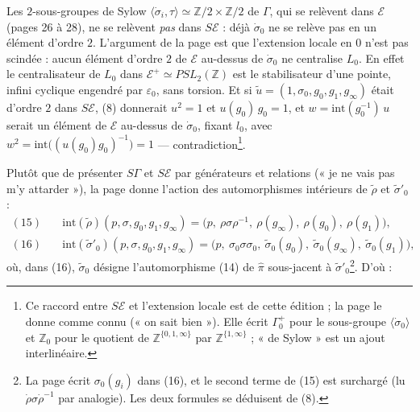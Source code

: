 \documentclass[11pt,a4paper]{article}
\begin{document}
Les $2$-sous-groupes de Sylow $\langle \dot\sigma_i, \tau \rangle \simeq
\mathbb{Z}/2 \times \mathbb{Z}/2$ de $\Gamma$, qui se relèvent dans
$\mathcal{E}$ (pages 26 à 28), ne se relèvent \emph{pas} dans $S\mathcal{E}$ :
déjà $\dot\sigma_0$ ne se relève pas en un élément d'ordre $2$. L'argument de la
page est que l'extension locale en $0$ n'est pas scindée : aucun élément
d'ordre $2$ de $\mathcal{E}$ au-dessus de $\dot\sigma_0$ ne centralise $L_0$. En
effet le centralisateur de $L_0$ dans $\mathcal{E}^{+} \simeq
PSL_2(\mathbb{Z})$ est le stabilisateur d'une pointe, infini cyclique engendré
par $\varepsilon_0$, sans torsion. Et si $\tilde u = (1, \sigma_0, g_0, g_1,
g_\infty)$ était d'ordre $2$ dans $S\mathcal{E}$, (8) donnerait $u^2 = 1$ et
$u(g_0)\,g_0 = 1$, et $w = \mathrm{int}(g_0^{-1})\,u$ serait un élément de
$\mathcal{E}$ au-dessus de $\dot\sigma_0$, fixant $l_0$, avec $w^2 =
\mathrm{int}\bigl((u(g_0)g_0)^{-1}\bigr) = 1$ — contradiction\footnote{Ce
raccord entre $S\mathcal{E}$ et l'extension locale est de cette édition ; la
page le donne comme connu (« on sait bien »). Elle écrit $\Gamma^{+}_0$ pour le
sous-groupe $\langle\dot\sigma_0\rangle$ et $\mathbb{Z}_0$ pour le quotient de
$\mathbb{Z}^{\{0,1,\infty\}}$ par $\mathbb{Z}^{\{1,\infty\}}$ ; « de Sylow » est
un ajout interlinéaire.}.

Plutôt que de présenter $S\Gamma$ et $S\mathcal{E}$ par générateurs et
relations (« je ne vais pas m'y attarder »), la page donne l'action des
automorphismes intérieurs de $\tilde\rho$ et $\tilde\sigma'_0$ :
\[
\begin{aligned}
(15)\quad & \mathrm{int}(\tilde\rho)(p, \sigma, g_0, g_1, g_\infty) =
\bigl(p,\ \rho\sigma\rho^{-1},\ \rho(g_\infty),\ \rho(g_0),\ \rho(g_1)\bigr),\\
(16)\quad & \mathrm{int}(\tilde\sigma'_0)(p, \sigma, g_0, g_1, g_\infty) =
\bigl(p,\ \sigma_0\sigma\sigma_0,\ \tilde\sigma_0(g_0),\ \tilde\sigma_0(g_\infty),\
\tilde\sigma_0(g_1)\bigr),
\end{aligned}
\]
où, dans (16), $\tilde\sigma_0$ désigne l'automorphisme (14) de $\widehat{\pi}$
sous-jacent à $\tilde\sigma'_0$\footnote{La page écrit $\sigma_0(g_i)$ dans (16),
et le second terme de (15) est surchargé (lu $\dot\rho\sigma\dot\rho^{-1}$ par
analogie). Les deux formules se déduisent de (8).}. D'où :
\end{document}
